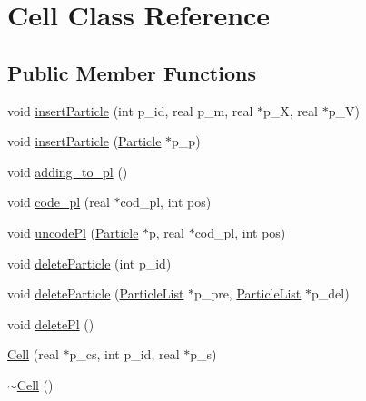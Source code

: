 \hypertarget{class_cell}{\section{Cell Class Reference}
\label{class_cell}
}
\subsection*{Public Member Functions}
\begin{DoxyCompactItemize}
\item 
void \hyperlink{class_cell_a68d76de23d77dd050d3e113db3091823}{insert\-Particle} (int p\-\_\-id, real p\-\_\-m, real $\ast$p\-\_\-\-X, real $\ast$p\-\_\-\-V)
\item 
void \hyperlink{class_cell_a5973afba19b7fc25be2852b27160a8fc}{insert\-Particle} (\hyperlink{struct_particle}{Particle} $\ast$p\-\_\-p)
\item 
void \hyperlink{class_cell_a2afe22df5392453b6fe60574782fd487}{adding\-\_\-to\-\_\-pl} ()
\item 
void \hyperlink{class_cell_abce9121af723a8f89f5266a3d7aa8739}{code\-\_\-pl} (real $\ast$cod\-\_\-pl, int pos)
\item 
void \hyperlink{class_cell_a8dcdd7c20cd2a432040b08b391e429ed}{uncode\-Pl} (\hyperlink{struct_particle}{Particle} $\ast$p, real $\ast$cod\-\_\-pl, int pos)
\item 
void \hyperlink{class_cell_ab45662260e77aedc20a7c1a0ed54c8d3}{delete\-Particle} (int p\-\_\-id)
\item 
void \hyperlink{class_cell_a7048e5b320828ca5939a431709a6b0d6}{delete\-Particle} (\hyperlink{struct_particle_list}{Particle\-List} $\ast$p\-\_\-pre, \hyperlink{struct_particle_list}{Particle\-List} $\ast$p\-\_\-del)
\item 
void \hyperlink{class_cell_a3bdc184e5d38f468c7cfb04505102134}{delete\-Pl} ()
\item 
\hyperlink{class_cell_ad27a69d728f137902642de1fa82a5715}{Cell} (real $\ast$p\-\_\-cs, int p\-\_\-id, real $\ast$p\-\_\-s)
\item 
\hyperlink{class_cell_a9fa559f7a28e2b4336c6879ca09304d8}{$\sim$\-Cell} ()
\end{DoxyCompactItemize}
